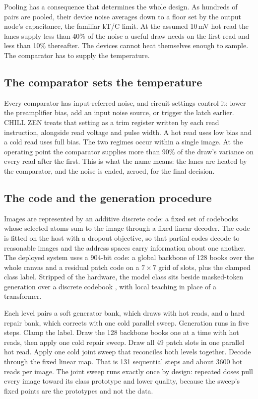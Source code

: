 \documentclass[reprint,amsmath,amssymb,aps,nofootinbib]{revtex4-2}
\begin{document}
Pooling has a consequence that determines the whole design. As
hundreds of pairs are pooled, their device noise averages down to a
floor set by the output node's capacitance, the familiar kT/C limit. At
the assumed 10\,mV hot read the lanes supply less than 40\% of the
noise a useful draw needs on the first read and less than 10\%
thereafter. The devices cannot heat themselves enough to sample. The
comparator has to supply the temperature.

\subsection{The comparator sets the temperature}

Every comparator has input-referred noise, and circuit settings control
it: lower the preamplifier bias, add an input noise source, or trigger
the latch earlier. CHILL ZEN treats that setting as a trim register
written by each read instruction, alongside read voltage and pulse
width. A hot read uses low bias and a cold read uses full bias. The
two regimes occur within a single image. At the operating point the
comparator supplies more than 90\% of the draw's variance on every
read after the first. This is what the name means: the lanes are
heated by the comparator, and the noise is ended, zeroed, for the
final decision.

\subsection{The code and the generation procedure}

Images are represented by an additive discrete code: a fixed set of
codebooks whose selected atoms sum to the image through a fixed linear
decoder. The code is fitted on the host with a dropout objective, so
that partial codes decode to reasonable images and the address spaces
carry information about one another. The deployed system uses a
904-bit code: a global backbone of 128 books over the whole canvas and
a residual patch code on a $7 \times 7$ grid of slots, plus the
clamped class label. Stripped of the hardware, the model class sits
beside masked-token generation over a discrete codebook
\cite{chang2022maskgit,vandenoord2017vqvae}, with local teaching in
place of a transformer.

Each level pairs a soft generator bank, which draws with hot reads,
and a hard repair bank, which corrects with one cold parallel sweep.
Generation runs in five steps. Clamp the label. Draw the 128 backbone
books one at a time with hot reads, then apply one cold repair sweep.
Draw all 49 patch slots in one parallel hot read. Apply one cold joint
sweep that reconciles both levels together. Decode through the fixed
linear map. That is 131 sequential steps and about 3600 hot reads per
image. The joint sweep runs exactly once by design: repeated doses
pull every image toward its class prototype and lower quality, because
the sweep's fixed points are the prototypes and not the data.
\end{document}
